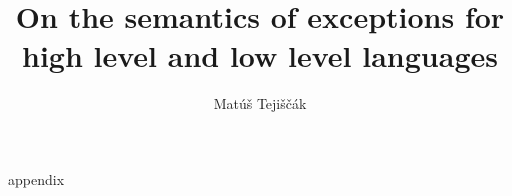 

\title{On the semantics of exceptions for high level and low level languages}
\author{Matúš Tejiščák}



%

\newpage

\openright \pagestyle{plain} \setcounter{page}{1} \tableofcontents

\mainmatter

\pagestyle{headings}





\pagestyle{plain}

\appendix
appendix

%

\openright

